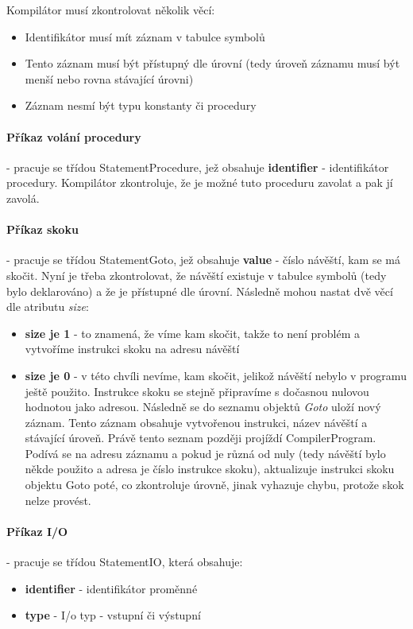 \documentclass[
12pt,
a4paper,
pdftex,
czech,
titlepage
]{report}
\begin{document}
Kompilátor musí zkontrolovat několik věcí:
\begin{itemize}
\item Identifikátor musí mít záznam v tabulce symbolů
\item Tento záznam musí být přístupný dle úrovní (tedy úroveň záznamu musí být menší nebo rovna stávající úrovni)
\item Záznam nesmí být typu konstanty či procedury
\end{itemize}

\paragraph{Příkaz volání procedury} - pracuje se třídou StatementProcedure, jež obsahuje \textbf{identifier} - identifikátor procedury. Kompilátor zkontroluje, že je možné tuto proceduru zavolat a pak jí zavolá.

\paragraph{Příkaz skoku} - pracuje se třídou StatementGoto, jež obsahuje \textbf{value} - číslo návěští, kam se má skočit. Nyní je třeba zkontrolovat, že návěští existuje v tabulce symbolů (tedy bylo deklarováno) a že je přístupné dle úrovní. Následně mohou nastat dvě věcí dle atributu \textit{size}:
\begin{itemize}
\item \textbf{size je 1} - to znamená, že víme kam skočit, takže to není problém a vytvoříme instrukci skoku na adresu návěští
\item \textbf{size je 0} - v této chvíli nevíme, kam skočit, jelikož návěští nebylo v programu ještě použito. Instrukce skoku se stejně připravíme s dočasnou nulovou hodnotou jako adresou. Následně se do seznamu objektů \textit{Goto} uloží nový záznam. Tento záznam obsahuje vytvořenou instrukci, název návěští a stávající úroveň. Právě tento seznam později projíždí CompilerProgram. Podívá se na adresu záznamu a pokud je různá od nuly (tedy návěští bylo někde použito a adresa je číslo instrukce skoku), aktualizuje instrukci skoku objektu Goto poté, co zkontroluje úrovně, jinak vyhazuje chybu, protože skok nelze provést.
\end{itemize}

\paragraph{Příkaz I/O} - pracuje se třídou StatementIO, která obsahuje:
\begin{itemize}
\item \textbf{identifier} - identifikátor proměnné
\item \textbf{type} - I/o typ - vstupní či výstupní
\end{itemize}
\end{document}
